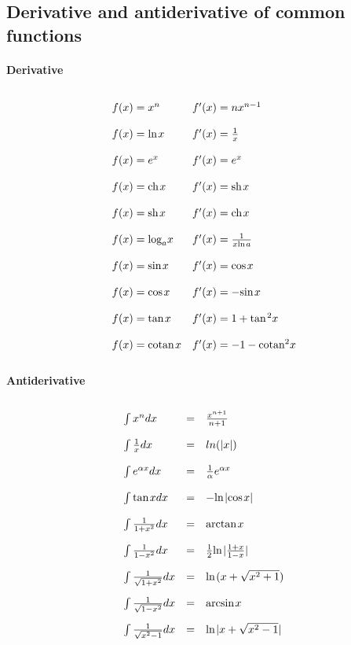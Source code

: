 \documentclass[a4paper,10pt]{article}
\newcommand{\fnc}[2]{%
  \text{#1}\hspace{1pt} #2
}
\begin{document}
\subsection{Derivative and antiderivative of common functions}
\begin{multicols}{2}
\paragraph{Derivative}
\[
\def\arraystretch{2.0}
\begin{array}{ll}
f(x)=x^n             & f'(x)=nx^{n-1}                     \\
f(x)=\fnc{ln}{x}     & f'(x)=\frac{1}{x}                  \\
f(x)=e^x             & f'(x)=e^x                          \\
f(x)=\fnc{ch}{x}     & f'(x)=\fnc{sh}{x}                  \\
f(x)=\fnc{sh}{x}     & f'(x)=\fnc{ch}{x}                  \\
f(x)=\text{log}_a x  & f'(x)=\frac{1}{x \fnc{ln}{a}}      \\ 
f(x)=\fnc{sin}{x}    & f'(x)=\fnc{cos}{x}                 \\
f(x)=\fnc{cos}{x}    & f'(x)=-\fnc{sin}{x}                \\
f(x)=\fnc{tan}{x}    & f'(x)=1+\fnc{tan}^2x               \\
f(x)=\fnc{cotan}{x}  & f'(x)=-1-\text{cotan}^2x    
\end{array}
\]
\columnbreak
\paragraph{Antiderivative}
\[
\def\arraystretch{2.0}
\begin{array}{lcl}
\int x^n                    dx   &=& \frac{x^{n+1}}{n+1}                      \\
\int \frac{1}{x}            dx   &=& ln(|x|)                                  \\
\int e^{\alpha x}           dx   &=& \frac{1}{\alpha} e^{\alpha x}            \\
\int \fnc{tan}{x}           dx   &=& - \fnc{ln}{ |\fnc{cos}{x}|}              \\
\int \frac{1}{1+x^2}        dx   &=& \fnc{arctan}{x}                          \\
\int \frac{1}{1-x^2}        dx   &=&\frac{1}{2}\fnc{ln}{|\frac{1+x}{1-x}|}    \\
\int \frac{1}{\sqrt{1+x^2}} dx   &=& \fnc{ln}{(x+\sqrt{x^2+1})}               \\
\int \frac{1}{\sqrt{1-x^2}} dx   &=& \fnc{arcsin}{x}                          \\
\int \frac{1}{\sqrt{x^2-1}} dx   &=& \fnc{ln}{|x+\sqrt{x^2-1}|}
\end{array}
\]
\end{multicols}
\end{document}

